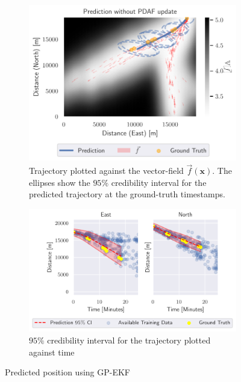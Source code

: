 \begin{figure}
    \centering
    \begin{subfigure}{\textwidth}
        \centering
        \includegraphics[width=\textwidth]{figures/dyngp/gp_ekf.pdf}
        \caption{Trajectory plotted against the vector-field $\vec{f}(\boldsymbol{x})$. The ellipses show the $95\%$ credibility interval for the predicted trajectory at the ground-truth timestamps.}
    \end{subfigure}
    \begin{subfigure}{\textwidth}
        \centering
        \includegraphics[width=\textwidth]{figures/dyngp/gp_ekf_state.pdf}
        \caption{$95\%$ credibility interval for the trajectory plotted against time}
    \end{subfigure}
    \caption{Predicted position using GP-EKF}
    \label{fig:gp_ekf}
\end{figure}



